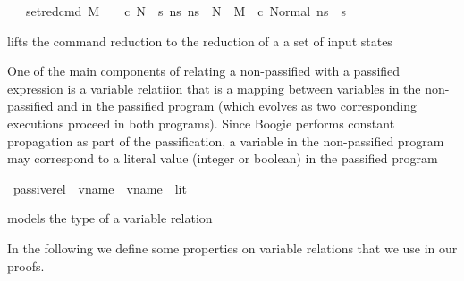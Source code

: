 \begin{isabellebody}
\ \ \ {\isachardoublequoteopen}set{\isacharunderscore}{\kern0pt}red{\isacharunderscore}{\kern0pt}cmd\ M\ {\isasymLambda}\ {\isasymGamma}\ {\isasymOmega}\ c\ N\ {\isacharequal}{\kern0pt}\ {\isacharbraceleft}{\kern0pt}s{\isachardot}{\kern0pt}\ {\isasymexists}n{\isacharunderscore}{\kern0pt}s{\isachardot}{\kern0pt}\ n{\isacharunderscore}{\kern0pt}s\ {\isasymin}\ N\ {\isasymand}\ M{\isacharcomma}{\kern0pt}{\isasymLambda}{\isacharcomma}{\kern0pt}{\isasymGamma}{\isacharcomma}{\kern0pt}{\isasymOmega}\ {\isasymturnstile}\ {\isasymlangle}c{\isacharcomma}{\kern0pt}\ Normal\ n{\isacharunderscore}{\kern0pt}s{\isasymrangle}\ {\isasymrightarrow}\ s{\isacharbraceright}{\kern0pt}{\isachardoublequoteclose}\isanewline
\isanewline
{}\isamarkupfalse%
%
\begin{isamarkuptext}%
 lifts the command reduction to the reduction of a a set of input states%
\end{isamarkuptext}\isamarkuptrue%
%
\isadelimdocument
%
\endisadelimdocument
%
\isatagdocument
%
\isamarkuptrue%
%
\endisatagdocument
{\isafolddocument}%
%
\isadelimdocument
%
\endisadelimdocument
%
\begin{isamarkuptext}%
One of the main components of relating a non-passified with a passified expression is a variable
relatiion that is a mapping between variables in the non-passified and in the passified program 
(which evolves as two corresponding executions proceed in both programs). Since Boogie performs 
constant propagation as part of the passification, a variable in the non-passified program may 
correspond to a literal value (integer or boolean) in the passified program%
\end{isamarkuptext}\isamarkuptrue%
\isamarkupfalse%
\ passive{\isacharunderscore}{\kern0pt}rel\ {\isacharequal}{\kern0pt}\ {\isachardoublequoteopen}vname\ {\isasymrightharpoonup}\ {\isacharparenleft}{\kern0pt}vname\ {\isacharplus}{\kern0pt}\ lit{\isacharparenright}{\kern0pt}{\isachardoublequoteclose}%
\begin{isamarkuptext}%
 models the type of a variable relation%
\end{isamarkuptext}\isamarkuptrue%
%
\begin{isamarkuptext}%
In the following we define some properties on variable relations that we use in our proofs.%

\end{isamarkuptext}
\end{isabellebody}
